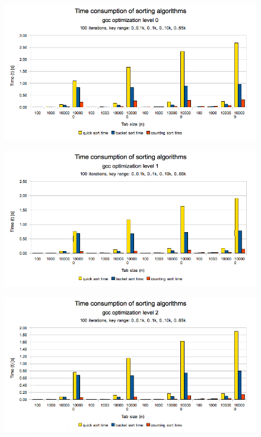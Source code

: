 \documentclass[12pt]{article}
\begin{document}
\begin{figure}[H]
    \centering
    \includegraphics[width=1\textwidth]{compare-gcc-opt0}
\end{figure}

\begin{figure}[H]
    \centering
    \includegraphics[width=1\textwidth]{compare-gcc-opt1}
\end{figure}

\begin{figure}[H]
    \centering
    \includegraphics[width=1\textwidth]{compare-gcc-opt2}
\end{figure}
\end{document}
